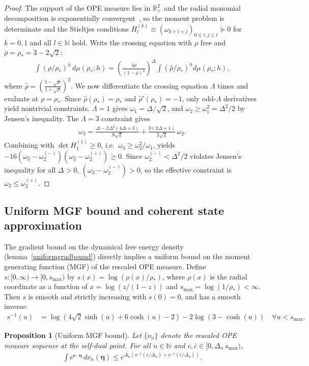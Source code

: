 \documentclass[a4paper,11pt]{article}
\theoremstyle{plain}
\newtheorem{prop}[thm]{Proposition}
\theoremstyle{definition}
\theoremstyle{remark}
\newcommand{\bs}[1]{\boldsymbol{#1}}
\newcommand{\rhob}{{\bar{\rho}}}
\newcommand{\ba}{\begin{equation} \begin{aligned}}
\newcommand{\ea}{\end{aligned} \end{equation}}
\newcommand{\De}{\Delta}
\begin{document}
\begin{appendix}
\begin{proof}
The support of the OPE measure lies in $\mathbb{R}^2_+$ and the radial monomial decomposition is exponentially convergent~\cite{Pappadopulo:2012jk}, so the moment problem is determinate and the Stieltjes conditions $H^{(k)}_l\equiv \left(\omega_{k+i+j}\right)_{0 \leq i,j \leq l} \succeq 0$ for $k = 0,1$ and all $l \in\mathbb{N}$ hold. Write the crossing equation with $\rho$ free and $\rhob = \rho_* = 3-2\sqrt{2}$:
\ba
\int (\rho/\rho_*)^h \,d\mu(\rho_*;h) = \left(\frac{4\rho}{(1-\rho)^2}\right)^{\!\De} \int \left(\hat{\rho}/\rho_* \right)^h d\mu(\rho_*;h),
\ea
where $\hat{\rho} = \left(\frac{1-\sqrt{\rho}}{1+\sqrt{\rho}}\right)^2$. We now differentiate the crossing equation $\Lambda$ times and evaluate at $\rho = \rho_*$. Since $\hat{\rho}(\rho_*) = \rho_*$ and $\hat{\rho}'(\rho_*) = -1$, only odd-$\Lambda$ derivatives yield nontrivial constraints. $\Lambda = 1$ gives $\omega_1 = \De/\sqrt{2}$, and $\omega_2 \geq \omega_1^2 = \De^2/2$ by Jensen's inequality. The $\Lambda = 3$ constraint gives
\ba
\omega_3 = \frac{\De - 2\De^2(4\De+3)}{8\sqrt{2}} + \frac{3(2\De+1)}{2\sqrt{2}}\,\omega_2.
\ea
Combining with $\det H^{(1)}_1 \geq 0$, i.e.\ $\omega_3 \geq \omega_2^2/\omega_1$, yields $-16(\omega_2 - \omega_2^{(-)})(\omega_2 - \omega_2^{(+)}) \geq 0$. Since $\omega_2^{(-)} < \De^2/2$ violates Jensen's inequality for all $\De > 0$, $(\omega_2 - \omega_2^{(-)}) > 0$, so the effective constraint is $\omega_2 \leq \omega_2^{(+)}$.
\end{proof}


\subsection{Uniform MGF bound and coherent state approximation}
\label{mgfsection}
 
The gradient bound on the dynamical free energy density (lemma~\ref{uniformgradbound}) directly implies a uniform bound on the moment generating function (MGF) of the rescaled OPE measure. Define $s: [0,\infty) \to [0, s_{\max})$ by $s(x) = \log(\rho(x)/\rho_*)$, where $\rho(x)$ is the radial coordinate as a function of $x = \log(z/(1-z))$ and $s_{\max} = \log(1/\rho_*) < \infty$. Then $s$ is smooth and strictly increasing with $s(0) = 0$, and has a smooth inverse:
\ba
s^{-1}(u) &= \log \left(4 \sqrt{2} \sinh (u)+6 \cosh (u)-2\right)-2 \log (3-\cosh (u))\quad \forall u < s_{\max}.
\ea

\begin{prop}[Uniform MGF bound]
\label{mgfbound}
Let $\{\nu_n\}$ denote the rescaled OPE measure sequence at the self-dual point. For all $n \in \mathbb{N}$ and $c,\bar{c} \in [0, \De_n\, s_{\max})$,
\ba
\int e^{\bs{c} \cdot \bs{\eta}}\, d\nu_n(\bs{\eta}) \leq e^{\De_n\left(s^{-1}(c/\De_n) + s^{-1}(\bar{c}/\De_n)\right)}.
\ea
\end{prop}
 

\end{appendix}
\end{document}
